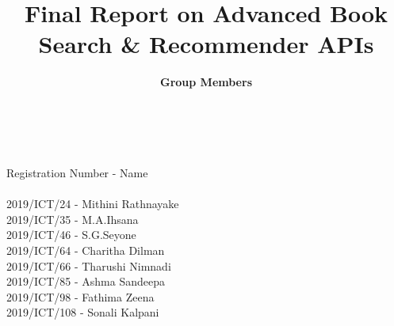 \documentclass{article}
\begin{document}
\title{Final Report on Advanced Book Search \& Recommender APIs}
\maketitle
\author{\textbf{Group Members}}\\\\
Registration Number - Name \\\\
2019/ICT/24 - Mithini Rathnayake \\
2019/ICT/35 - M.A.Ihsana \\
2019/ICT/46 - S.G.Seyone \\
2019/ICT/64 - Charitha Dilman \\
2019/ICT/66 - Tharushi Nimnadi \\
2019/ICT/85 - Ashma Sandeepa \\
2019/ICT/98 - Fathima Zeena \\
2019/ICT/108 - Sonali Kalpani \\
\end{document}
